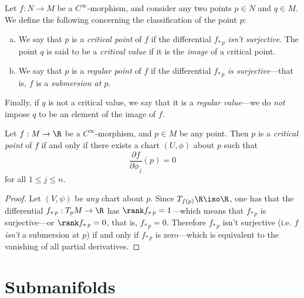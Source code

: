 \begin{definition}
\label{def:critical-point-and-value}
Let \(f: N \to M\) be a \(C^{\infty}\)-morphism, and consider any two points
\(p \in N\) and \(q \in M\). We define the following concerning the
classification of the point \(p\):
\begin{enumerate}[(a)]\setlength\itemsep{0em}
\item We say that \(p\) is a \emph{critical point} of \(f\) if the differential
  \(f_{*\, p}\) \emph{isn't surjective}. The point \(q\) is said to be a
  \emph{critival value} if it is the \emph{image} of a critical point.

\item We say that \(p\) is a \emph{regular point} of \(f\) if the differential
  \(f_{*\, p}\) \emph{is surjective}---that is, \(f\) is a \emph{submersion at
    \(p\)}.
\end{enumerate}
Finally, if \(q\) is not a critical value, we say that it is a \emph{regular
  value}---we do \emph{not} impose \(q\) to be an element of the image of \(f\).
\end{definition}

\begin{proposition}
\label{prop:critical-points-iff-vanishing-derivatives}
Let \(f: M \to \R\) be a \(C^{\infty}\)-morphism, and \(p \in M\) be any
point. Then \(p\) is a \emph{critical point} of \(f\) if and only if there
exists a chart \((U, \phi)\) about \(p\) such that
\[
\frac{\partial f}{\partial \phi_j}(p) = 0
\]
for all \(1 \leq j \leq n\).
\end{proposition}

\begin{proof}
Let \((V, \psi)\) be \emph{any} chart about \(p\). Since
\(T_{f(p)} \R \iso \R\), one has that the differential
\(f_{*\, p}: T_p M \to \R\) has \(\rank f_{*\, p} = 1\)---which means that
\(f_{*\, p}\) is surjective---or \(\rank f_{*\, p} = 0\), that is,
\(f_{*\, p} = 0\). Therefore \(f_{*\, p}\) isn't surjective (i.e. \(f\)
\emph{isn't} a submersion at \(p\)) if and only if \(f_{*\, p}\) is zero---which
is equivalent to the vanishing of all partial derivatives.
\end{proof}

\section{Submanifolds}

